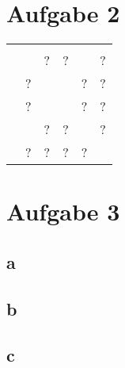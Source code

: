 \documentclass[10pt,a4paper]{article}
\begin{document}
\section{Aufgabe 2}
 \begin{tabular}{cccccc}
  \cellcolor{red} & \cellcolor{red} & \cellcolor{red} & \cellcolor{red} & \cellcolor{red} & \cellcolor{red}\\
  \cellcolor{red} & \cellcolor{black} & ? & ? & \cellcolor{red} & ?\\
  \cellcolor{red} & ? & \cellcolor{black} & \cellcolor{red} & ? & ?\\
  \cellcolor{red} & ? & \cellcolor{red} & \cellcolor{black} & ? & ?\\
  \cellcolor{red} & \cellcolor{red} & ? & ? & \cellcolor{black} & ?\\
  \cellcolor{red} & ? & ? & ? & ? & \cellcolor{black}\\
 \end{tabular}

\section{Aufgabe 3}
\subsection*{a}
\subsection*{b}
\subsection*{c}
\end{document}
